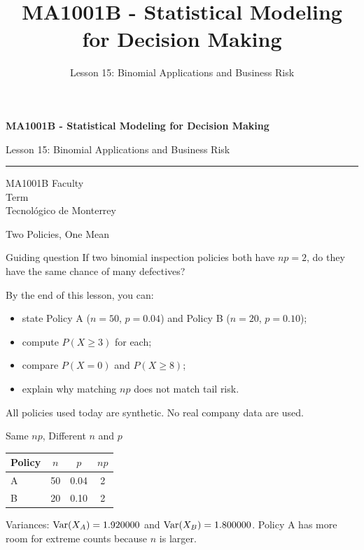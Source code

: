\documentclass[aspectratio=169,10pt,english]{beamer}
\title{MA1001B - Statistical Modeling for Decision Making}
\subtitle{Lesson 15: Binomial Applications and Business Risk}
\author{}
\institute{Tecnol\'ogico de Monterrey}
\date{}
\begin{document}
\begin{frame}[plain]
  \vspace{1.2cm}
  {\Large\bfseries MA1001B - Statistical Modeling for Decision Making\par}
  \vspace{0.7cm}
  {\large Lesson 15: Binomial Applications and Business Risk\par}
  \vspace{0.7cm}
  {\color{TecRojo}\rule{\textwidth}{1.2pt}}
  \vspace{0.8cm}

  MA1001B Faculty\\[0.3cm]
  Term\\[0.3cm]
  Tecnol\'ogico de Monterrey
\end{frame}

\begin{frame}{Two Policies, One Mean}
  \begin{alertblock}{Guiding question}
    If two binomial inspection policies both have $np=2$, do they have the
    same chance of many defectives?
  \end{alertblock}

  \vspace{0.6em}
  By the end of this lesson, you can:
  \begin{itemize}
    \item state Policy A ($n=50$, $p=0.04$) and Policy B ($n=20$, $p=0.10$);
    \item compute $P(X\ge 3)$ for each;
    \item compare $P(X=0)$ and $P(X\ge 8)$;
    \item explain why matching $np$ does not match tail risk.
  \end{itemize}

  \vfill
  \scriptsize All policies used today are synthetic. No real company data are used.
\end{frame}

\begin{frame}{Same $np$, Different $n$ and $p$}
  \small
  \begin{center}
    \begin{tabular}{lccc}
      \toprule
      \textbf{Policy} & $n$ & $p$ & $np$ \\
      \midrule
      A & 50 & 0.04 & 2 \\
      B & 20 & 0.10 & 2 \\
      \bottomrule
    \end{tabular}
  \end{center}

  \vspace{0.5em}
  Variances: $\operatorname{Var}(X_A)=1.920000$ and $\operatorname{Var}(X_B)=1.800000$. Policy A has more
  room for extreme counts because $n$ is larger.
\end{frame}
\end{document}
